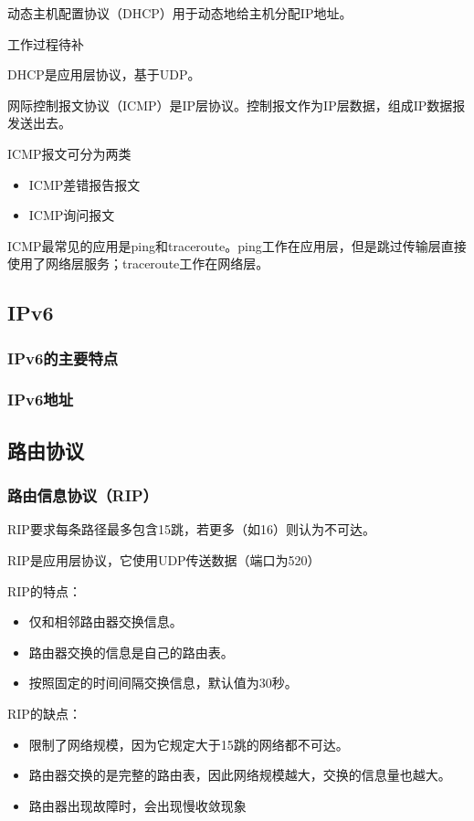 \documentclass[12pt, a4paper, oneside]{ctexart}
\begin{document}
动态主机配置协议（DHCP）用于动态地给主机分配IP地址。

工作过程待补

DHCP是应用层协议，基于UDP。

网际控制报文协议（ICMP）是IP层协议。控制报文作为IP层数据，组成IP数据报发送出去。

ICMP报文可分为两类
\begin{itemize}
    \item ICMP差错报告报文
    \item ICMP询问报文
\end{itemize}

ICMP最常见的应用是ping和traceroute。ping工作在应用层，但是跳过传输层直接使用了网络层服务；traceroute工作在网络层。

\subsection{IPv6}

\subsubsection{IPv6的主要特点}

\subsubsection{IPv6地址}

\subsection{路由协议}

\subsubsection{路由信息协议（RIP）}

RIP要求每条路径最多包含15跳，若更多（如16）则认为不可达。

RIP是应用层协议，它使用UDP传送数据（端口为520）

RIP的特点：
\begin{itemize}
    \item 仅和相邻路由器交换信息。
    \item 路由器交换的信息是自己的路由表。
    \item 按照固定的时间间隔交换信息，默认值为30秒。
\end{itemize}

RIP的缺点：
\begin{itemize}
    \item 限制了网络规模，因为它规定大于15跳的网络都不可达。
    \item 路由器交换的是完整的路由表，因此网络规模越大，交换的信息量也越大。
    \item 路由器出现故障时，会出现慢收敛现象
\end{itemize}
\end{document}

